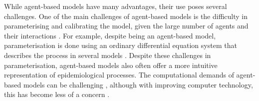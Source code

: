 \documentclass[12pt]{article}
\begin{document}
While agent-based models have many advantages, their use poses several challenges. One of the main challenges of agent-based models is the difficulty in parameterising and calibrating the model, given the large number of agents and their interactions \cite{crooks2008key,laubenbacher2020agent, colman1998complexity}. For example, despite being an agent-based model, parameterisation is done using an ordinary differential equation system that describes the process in several models \cite{white2018mathematical,huber2021radical,nekkab2021estimated,obadia2022developing}. Despite these challenges in parameterisation, agent-based models also often offer a more intuitive representation of epidemiological processes. The computational demands of agent-based models can be challenging \cite{samuelson2006agent}, although with improving computer technology, this has become less of a concern \cite{Darrin_Darrin_2021}. 
\end{document}
